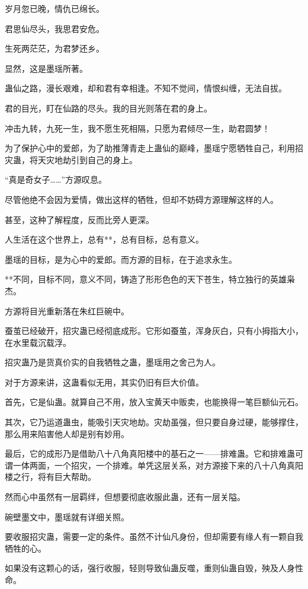 \begin{this_body}
岁月忽已晚，情仇已绵长。

君思仙尽头，我思君安危。

生死两茫茫，为君梦还乡。

显然，这是墨瑶所著。

蛊仙之路，漫长艰难，却和君有幸相逢。不知不觉间，情恨纠缠，无法自拔。

君的目光，盯在仙路的尽头。我的目光则落在君的身上。

冲击九转，九死一生，我不愿生死相隔，只愿为君倾尽一生，助君圆梦！

为了保护心中的爱郎，为了助推薄青走上蛊仙的巅峰，墨瑶宁愿牺牲自己，利用招灾蛊，将天灾地劫引到自己的身上。

“真是奇女子……”方源叹息。

尽管他绝不会因为爱情，做出这样的牺牲，但却不妨碍方源理解这样的人。

甚至，这种了解程度，反而比旁人更深。

人生活在这个世界上，总有**，总有目标，总有意义。

墨瑶的目标，是为心中的爱郎。而方源的目标，在于追求永生。

**不同，目标不同，意义不同，铸造了形形色色的天下苍生，特立独行的英雄枭杰。

方源将目光重新落在朱红巨碗中。

蚕茧已经破开，招灾蛊已经彻底成形。它形如蚕茧，浑身灰白，只有小拇指大小，在水里载沉载浮。

招灾蛊乃是货真价实的自我牺牲之蛊，墨瑶用之舍己为人。

对于方源来讲，这蛊看似无用，其实仍旧有巨大价值。

首先，它是仙蛊。就算自己不用，放入宝黄天中贩卖，也能换得一笔巨额仙元石。

其次，它乃运道蛊虫，能吸引天灾地劫。灾劫虽强，但只要自身过硬，能够撑住，那么用来陷害他人却是别有妙用。

最后，它的成形乃是借助八十八角真阳楼中的基石之一——排难蛊。它和排难蛊可谓一体两面，一个招灾，一个排难。单凭这层关系，对方源接下来的八十八角真阳楼之行，将有巨大帮助。

然而心中虽然有一层羁绊，但想要彻底收服此蛊，还有一层关隘。

碗壁墨文中，墨瑶就有详细关照。

要收服招灾蛊，需要一定的条件。虽然不计仙凡身份，但却需要有缘人有一颗自我牺牲的心。

如果没有这颗心的话，强行收服，轻则导致仙蛊反噬，重则仙蛊自毁，殃及人身性命。


\end{this_body}
